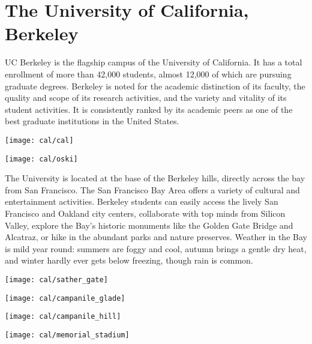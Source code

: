 
\section*{The University of California, Berkeley}

\begin{minipage}{0.8\textwidth}

	UC Berkeley is the flagship campus of the University of California.
	It has a total enrollment of more than 42,000 students, almost 12,000 of which are pursuing graduate degrees. 
	Berkeley is noted for the academic distinction of its faculty, the quality and scope of its research activities, and the variety and vitality of its student activities. 
	It is consistently ranked by its academic peers as one of the best graduate institutions in the United States.\\ 
\end{minipage}
\begin{minipage}{0.2\textwidth}
	\hfill\texttt{[image: cal/cal]}
\end{minipage}

\vspace{0.5cm}

\begin{minipage}{0.2\textwidth}
	\texttt{[image: cal/oski]}
\end{minipage}
\begin{minipage}{0.8\textwidth}
	The University is located at the base of the Berkeley hills, directly across the bay from San Francisco. 
	The San Francisco Bay Area offers a variety of cultural and entertainment activities. 
	Berkeley students can easily access the lively San Francisco and Oakland city centers, collaborate with top minds from Silicon Valley, explore the Bay's historic monuments like the Golden Gate Bridge and Alcatraz, or hike in the abundant parks and nature preserves. 
	Weather in the Bay is mild year round: summers are foggy and cool, autumn brings a gentle dry heat, and winter hardly ever gets below freezing, though rain is common.  
\end{minipage}

\vspace{1.25cm}
\begin{minipage}{0.49\textwidth}
	\texttt{[image: cal/sather\_gate]}
\end{minipage}
\hfill
\begin{minipage}{0.49\textwidth}
	\texttt{[image: cal/campanile\_glade]}
\end{minipage}

\begin{minipage}{0.49\textwidth}
	\texttt{[image: cal/campanile\_hill]}
\end{minipage}
\hfill
\begin{minipage}{0.49\textwidth}
	\texttt{[image: cal/memorial\_stadium]}
\end{minipage}
\vspace{0.5cm}
